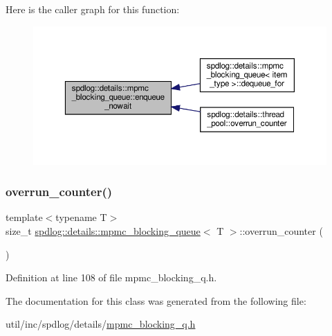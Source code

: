 Here is the caller graph for this function\+:
\nopagebreak
\begin{figure}[H]
\begin{center}
\leavevmode
\includegraphics[width=350pt]{classspdlog_1_1details_1_1mpmc__blocking__queue_a1280489c9035a705f50f04905a5ed394_icgraph}
\end{center}
\end{figure}
\mbox{\label{classspdlog_1_1details_1_1mpmc__blocking__queue_a15e3d12dff953034d5aad5590b8282cd}} 
\subsubsection{\texorpdfstring{overrun\+\_\+counter()}{overrun\_counter()}}
{\footnotesize\ttfamily template$<$typename T$>$ \\
size\+\_\+t \hyperlink{classspdlog_1_1details_1_1mpmc__blocking__queue}{spdlog\+::details\+::mpmc\+\_\+blocking\+\_\+queue}$<$ T $>$\+::overrun\+\_\+counter (\begin{DoxyParamCaption}{ }\end{DoxyParamCaption})\hspace{0.3cm}{\ttfamily [inline]}}



Definition at line 108 of file mpmc\+\_\+blocking\+\_\+q.\+h.



The documentation for this class was generated from the following file\+:\begin{DoxyCompactItemize}
\item 
util/inc/spdlog/details/\hyperlink{mpmc__blocking__q_8h}{mpmc\+\_\+blocking\+\_\+q.\+h}\end{DoxyCompactItemize}
